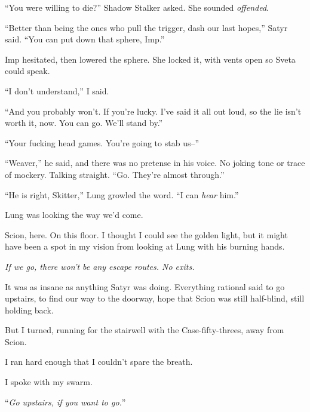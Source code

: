 ``You were willing to die?''  Shadow Stalker asked.  She sounded \emph{offended}.



``Better than being the ones who pull the trigger, dash our last hopes,'' Satyr said.  ``You can put down that sphere, Imp.''



Imp hesitated, then lowered the sphere.  She locked it, with vents open so Sveta could speak.



``I don't understand,'' I said.



``And you probably won't.  If you're lucky.  I've said it all out loud, so the lie isn't worth it, now.  You can go.  We'll stand by.''



``Your fucking head games.  You're going to stab us--''



``Weaver,'' he said, and there was no pretense in his voice.  No joking tone or trace of mockery.  Talking straight.  ``Go.  They're almost through.''



``He is right, Skitter,'' Lung growled the word.  ``I can \emph{hear} him.''



Lung was looking the way we'd come.



Scion, here.  On this floor.  I thought I could see the golden light, but it might have been a spot in my vision from looking at Lung with his burning hands.



\emph{If we go, there won't be any escape routes.  No exits.}



It was as insane as anything Satyr was doing.  Everything rational said to go upstairs, to find our way to the doorway, hope that Scion was still half-blind, still holding back.



But I turned, running for the stairwell with the Case-fifty-threes, away from Scion.



I ran hard enough that I couldn't spare the breath.



I spoke with my swarm.



``\emph{Go upstairs, if you want to go.}''



